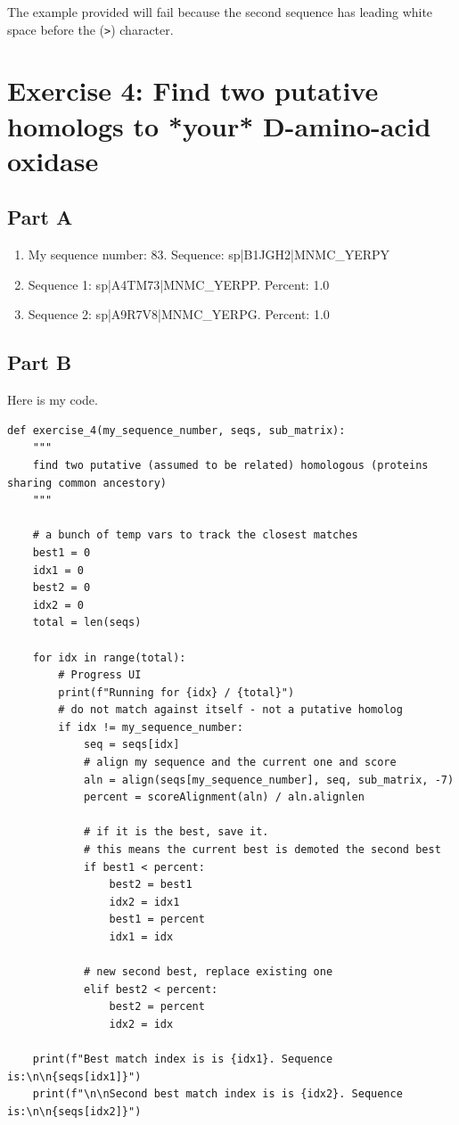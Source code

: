 \documentclass{article} %
\begin{document}
The example provided will fail because the second sequence has leading white space before the (\verb+>+) character.

\section{Exercise 4: Find two putative homologs to *your* D-amino-acid oxidase}

\subsection{Part A}

\begin{enumerate}
    \item My sequence number: 83. Sequence: sp|B1JGH2|MNMC\_YERPY
    \item Sequence 1: sp|A4TM73|MNMC\_YERPP. Percent: 1.0
    \item Sequence 2: sp|A9R7V8|MNMC\_YERPG. Percent: 1.0
\end{enumerate}

\subsection{Part B}

Here is my code.

\begin{verbatim}
def exercise_4(my_sequence_number, seqs, sub_matrix):
    """
    find two putative (assumed to be related) homologous (proteins sharing common ancestory)
    """

    # a bunch of temp vars to track the closest matches
    best1 = 0
    idx1 = 0
    best2 = 0
    idx2 = 0
    total = len(seqs)

    for idx in range(total):
        # Progress UI
        print(f"Running for {idx} / {total}")
        # do not match against itself - not a putative homolog
        if idx != my_sequence_number:
            seq = seqs[idx]
            # align my sequence and the current one and score
            aln = align(seqs[my_sequence_number], seq, sub_matrix, -7)
            percent = scoreAlignment(aln) / aln.alignlen

            # if it is the best, save it.
            # this means the current best is demoted the second best
            if best1 < percent:
                best2 = best1
                idx2 = idx1
                best1 = percent
                idx1 = idx

            # new second best, replace existing one
            elif best2 < percent:
                best2 = percent
                idx2 = idx

    print(f"Best match index is is {idx1}. Sequence is:\n\n{seqs[idx1]}")
    print(f"\n\nSecond best match index is is {idx2}. Sequence is:\n\n{seqs[idx2]}")
\end{verbatim}
\end{document}
